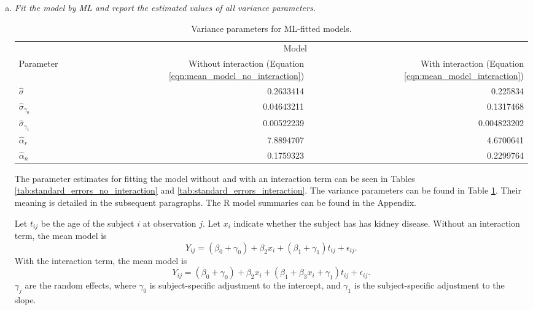 \documentclass[11pt, letterpaper]{article}
\begin{document}
\begin{enumerate}[(a)]
\item {\em Fit the model by ML and
report the
estimated values of all variance parameters. }

\begin{table}
  \centering
  \begin{tabular}{lrr}
    \toprule
    & \multicolumn{2}{c}{Model} \\
    Parameter & Without interaction (Equation \ref{eqn:mean_model_no_interaction}) & With interaction (Equation \ref{eqn:mean_model_interaction}) \\
    \midrule
    $\hat{\sigma}$ & 0.2633414 & 0.225834 \\
    $\hat{\sigma}_{\gamma_0}$ & 0.04643211 & 0.1317468 \\
    $\hat{\sigma}_{\gamma_1}$ & 0.00522239 & 0.004823202 \\
    $\hat{\alpha}_r$ & 7.8894707 & 4.6700641 \\
    $\hat{\alpha}_n$ & 0.1759323  & 0.2299764 \\
    \bottomrule
  \end{tabular}
  \caption{Variance parameters for ML-fitted models.}
  \label{tab:variance_parameters}
\end{table}

\begin{description}
  The parameter estimates for fitting the model without and with an interaction
  term can be seen in Tables \ref{tab:standard_errors_no_interaction} and
  \ref{tab:standard_errors_interaction}. The variance parameters can be found in
  Table \ref{tab:variance_parameters}. Their meaning is detailed in the
  subsequent paragraphs. The \textsf{R} model summaries can be found in the
  Appendix.

  Let $t_{ij}$ be the age of the subject $i$ at observation $j$. Let $x_i$
  indicate whether the subject has has kidney disease. Without an interaction
  term, the mean model is
  \begin{equation}
    Y_{ij} = \left(\beta_0 + \gamma_0\right) +
    \beta_2x_i +
    \left(\beta_1 + \gamma_1\right)t_{ij} + \epsilon_{ij}.
    \label{eqn:mean_model_no_interaction}
  \end{equation}
  With the interaction term, the mean model is
  \begin{equation}
    Y_{ij} = \left(\beta_0 + \gamma_0\right) +
    \beta_2x_i +
    \left(\beta_1 + \beta_3x_i +\gamma_1\right)t_{ij} + \epsilon_{ij}.
    \label{eqn:mean_model_interaction}
  \end{equation}
  $\gamma_j$ are the random effects, where $\gamma_0$ is subject-specific
  adjustment to the intercept, and $\gamma_1$ is the subject-specific adjustment
  to the slope.
  

\end{description}
\end{enumerate}
\end{document}
